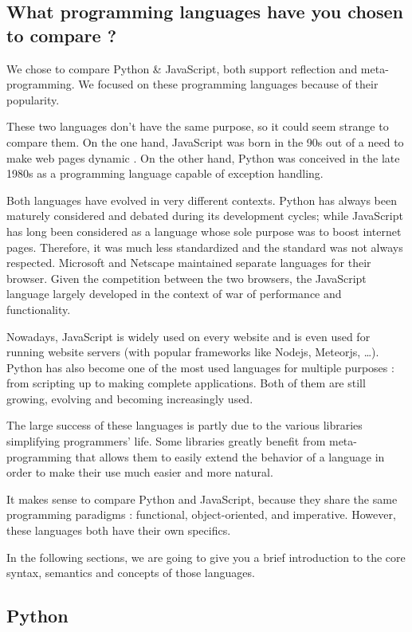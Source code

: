 \documentclass[a4paper,10pt]{article}
\begin{document}
\subsection{What programming languages have you chosen to compare ?}

We chose to compare Python \& JavaScript, both support reflection and meta-programming.
We focused on these programming languages because of their popularity.

These two languages don’t have the same purpose, so it could seem strange to compare them. On the one hand, JavaScript was born in the 90s out of a need to make web pages dynamic . On the other hand, Python was conceived in the late 1980s as a programming language capable of exception handling.

Both languages have evolved in very different contexts. Python has always been maturely considered and debated during its development cycles; while JavaScript has long been considered as a language whose sole purpose was to boost internet pages. Therefore, it was much less standardized and the standard was not always respected. Microsoft and Netscape maintained separate languages for their browser. Given the competition between the two browsers, the JavaScript language largely developed in the context of war of performance and functionality.

Nowadays, JavaScript is widely used on every website and is even used for running website servers (with popular frameworks like Nodejs, Meteorjs, \dots). Python has also become one of the most used languages for multiple purposes : from scripting up to making complete applications. Both of them are still growing, evolving and becoming increasingly used.

The large success of these languages is partly due to the various libraries simplifying  programmers' life. Some libraries greatly benefit from meta-programming that allows them to easily extend the behavior of a language in order to make their use much easier and more natural. 

It makes sense to compare Python and JavaScript, because they share the same programming paradigms : functional, object-oriented, and imperative. However, these languages both have their own specifics. 

In the following sections, we are going to give you a brief introduction to the core syntax, semantics and concepts of those languages.

\subsection{Python}
\setpy
\end{document}
